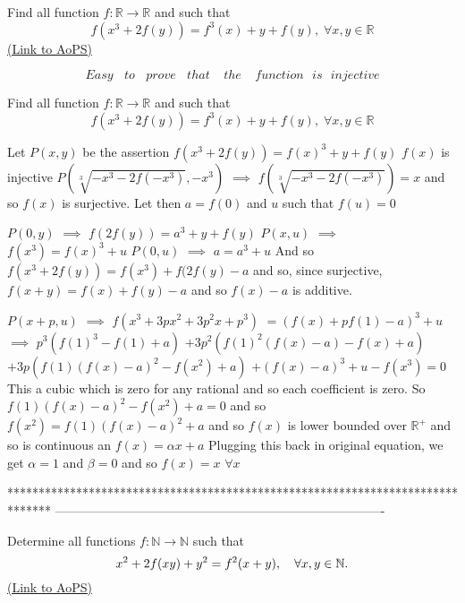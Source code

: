 \begin{problem}
	Find all function $f:\mathbb{R}\rightarrow \mathbb{R}$ and such that 
\[f(x^3+2f(y))=f^3(x)+y+f(y),\;\forall x,y\in \mathbb{R}\]
	\flushright \href{https://artofproblemsolving.com/community/c6h618937}{(Link to AoPS)}
\end{problem}



\begin{solution}
	\[Easy\: \: \: \: to\: \: \: \: prove \: \: \: \: that\: \: \: \: \: the \: \: \: \: \: function \: \: \: is \: \: \: injective\]
\end{solution}



\begin{solution}
	\begin{tcolorbox}Find all function $f:\mathbb{R}\rightarrow \mathbb{R}$ and such that 
\[f(x^3+2f(y))=f^3(x)+y+f(y),\;\forall x,y\in \mathbb{R}\]\end{tcolorbox}
Let $P(x,y)$ be the assertion $f(x^3+2f(y))=f(x)^3+y+f(y)$
$f(x)$ is injective
$P(\sqrt[3]{-x^3-2f(-x^3)},-x^3)$ $\implies$ $f(\sqrt[3]{-x^3-2f(-x^3)})=x$ and so $f(x)$ is surjective.
Let then $a=f(0)$ and $u$ such that $f(u)=0$

$P(0,y)$ $\implies$ $f(2f(y))=a^3+y+f(y)$
$P(x,u)$ $\implies$ $f(x^3)=f(x)^3+u$
$P(0,u)$ $\implies$ $a=a^3+u$
And so $f(x^3+2f(y))=f(x^3)+f(2f(y)-a$ and so, since surjective, $f(x+y)=f(x)+f(y)-a$ and so $f(x)-a$ is additive.

$P(x+p,u)$ $\implies$ $f(x^3+3px^2+3p^2x+p^3)$ $=(f(x)+pf(1)-a)^3+u$
$\implies$ $p^3(f(1)^3-f(1)+a)$ $+3p^2(f(1)^2(f(x)-a)-f(x)+a)$ $+3p(f(1)(f(x)-a)^2-f(x^2)+a)$ $+(f(x)-a)^3+u-f(x^3)=0$
This a cubic which is zero for any rational and so each coefficient is zero.
So $f(1)(f(x)-a)^2-f(x^2)+a=0$ and so $f(x^2)=f(1)(f(x)-a)^2+a$  and so $f(x)$ is lower bounded over $\mathbb R^+$ and so is continuous an $f(x)=\alpha x+a$
Plugging this back in original equation, we get $\alpha=1$ and $\beta=0$ and so $\boxed{f(x)=x}$ $\forall x$
\end{solution}
*******************************************************************************
-------------------------------------------------------------------------------

\begin{problem}
	Determine all functions $f : \mathbb{N} \to \mathbb{N}$ such that \[ x^2+2f(xy)+y^2=f^2(x+y), \ \ \ \forall x,y\in \Bbb{N}.\]
	\flushright \href{https://artofproblemsolving.com/community/c6h619008}{(Link to AoPS)}
\end{problem}



